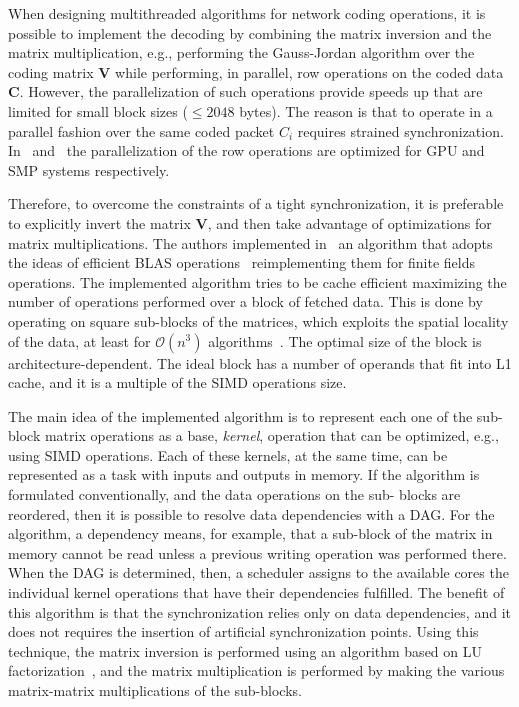 When designing multithreaded algorithms for network coding operations, it is
possible to implement the decoding by combining the matrix inversion and the
matrix multiplication, e.g., performing the Gauss-Jordan algorithm over the
coding matrix $\textbf{V}$ while performing, in parallel, row operations on the
coded data $\textbf{C}$. However, the parallelization of such operations provide
speeds up that are limited for small block sizes ($\leq 2048$ bytes). The reason
is that to operate in a parallel fashion over the same coded packet $C_i$
requires strained synchronization. In~\cite{5061951} and~\cite{4262451} the
parallelization of the row operations are optimized for \ac{GPU} and \ac{SMP}
systems respectively.

Therefore, to overcome the constraints of a tight synchronization, it is
preferable to explicitly invert the matrix $\textbf{V}$, and then take advantage
of optimizations for matrix multiplications. The authors implemented
in~\cite{wunderlich2015network} an algorithm that adopts the ideas of efficient
\ac{BLAS} operations~\cite{lawson1979basic} reimplementing them for finite
fields operations. The implemented algorithm tries to be cache efficient
maximizing the number of operations performed over a block of fetched data. This
is done by operating on square sub-blocks of the matrices, which exploits the
spatial locality of the data, at least for $\mathcal{O}(n^3)$
algorithms~\cite{golub2012matrix}. The optimal size of the block is
architecture-dependent. The ideal block has a number of operands that fit into
L1 cache, and it is a multiple of the \ac{SIMD} operations size.

The main idea of the implemented algorithm is to represent each one of the sub-
block matrix operations as a base, \textit{kernel}, operation that can be
optimized, e.g., using \ac{SIMD} operations. Each of these kernels, at the same
time, can be represented as a task with inputs and outputs in memory. If the
algorithm is formulated conventionally, and the data operations on the sub-
blocks are reordered, then it is possible to resolve data dependencies with a
\ac{DAG}. For the algorithm, a dependency means, for example, that a sub-block
of the matrix in memory cannot be read unless a previous writing operation was
performed there. When the \ac{DAG} is determined, then, a scheduler assigns to
the available cores the individual kernel operations that have their
dependencies fulfilled. The benefit of this algorithm is that the
synchronization relies only on data dependencies, and it does not requires the
insertion of artificial synchronization points. Using this technique, the matrix
inversion is performed using an algorithm based on LU
factorization~\cite{Dongarra:2011:HPM:2132876.2132885}, and the matrix
multiplication is performed by making the various matrix-matrix multiplications
of the sub-blocks.
